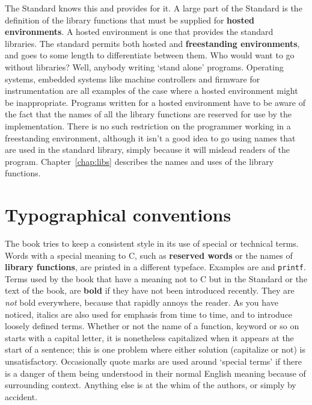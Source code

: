   The Standard knows this and provides for it. A large part of the Standard
   is the definition of the library functions that must be supplied for
   \textbf{hosted environments}. A hosted environment is one that provides
   the standard libraries. The standard permits both hosted and
   \textbf{freestanding environments}, and goes to some length to
   differentiate between them. Who would want to go without libraries? Well,
   anybody writing `stand alone' programs. Operating systems, embedded
   systems like machine controllers and firmware for instrumentation are all
   examples of the case where a hosted environment might be inappropriate.
   Programs written for a hosted environment have to be aware of the fact that
   the names of all the library functions are reserved for use by the
   implementation. There is no such restriction on the programmer working in a
   freestanding environment, although it isn't a good idea to go using names
   that are used in the standard library, simply because it will mislead
   readers of the program.
   Chapter~\ref{chap:libs} describes the names and uses
   of the library functions.


 
        \section*{Typographical conventions}
        

  

  The book tries to keep a consistent style in its use of special or
   technical terms. Words with a special meaning to C, such as
   \textbf{reserved words} or the names of \textbf{library functions}, are
   printed in a different typeface. Examples are \kint{} and
   \texttt{printf}. Terms used by the book that have a meaning not to C
   but in the Standard or the text of the book, are \textbf{bold} if they
   have not been introduced recently. They are \textit{not} bold everywhere,
   because that rapidly annoys the reader. As you have noticed, italics are
   also used for emphasis from time to time, and to introduce loosely defined
   terms. Whether or not the name of a function, keyword or so on starts with
   a capital letter, it is nonetheless capitalized when it appears at the
   start of a sentence; this is one problem where either solution (capitalize
   or not) is unsatisfactory. Occasionally quote marks are used around
   `special terms' if there is a danger of them being understood in
   their normal English meaning because of surrounding context. Anything else
   is at the whim of the authors, or simply by accident.



